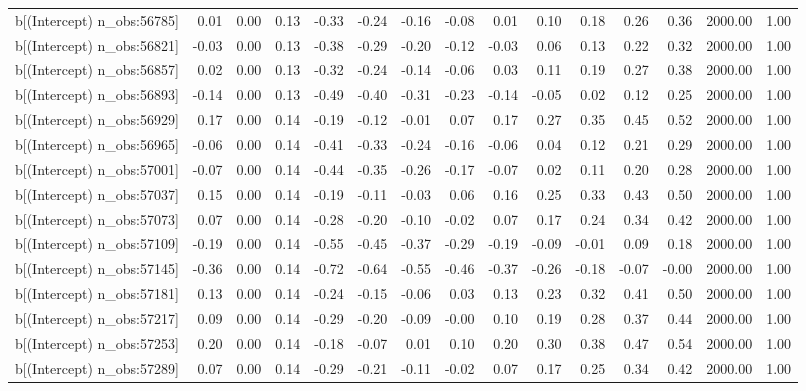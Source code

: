 \begin{table}[ht]
\begin{tabular}{rrrrrrrrrrrrrrr}
  b[(Intercept) n\_obs:56785] & 0.01 & 0.00 & 0.13 & -0.33 & -0.24 & -0.16 & -0.08 & 0.01 & 0.10 & 0.18 & 0.26 & 0.36 & 2000.00 & 1.00 \\ 
  b[(Intercept) n\_obs:56821] & -0.03 & 0.00 & 0.13 & -0.38 & -0.29 & -0.20 & -0.12 & -0.03 & 0.06 & 0.13 & 0.22 & 0.32 & 2000.00 & 1.00 \\ 
  b[(Intercept) n\_obs:56857] & 0.02 & 0.00 & 0.13 & -0.32 & -0.24 & -0.14 & -0.06 & 0.03 & 0.11 & 0.19 & 0.27 & 0.38 & 2000.00 & 1.00 \\ 
  b[(Intercept) n\_obs:56893] & -0.14 & 0.00 & 0.13 & -0.49 & -0.40 & -0.31 & -0.23 & -0.14 & -0.05 & 0.02 & 0.12 & 0.25 & 2000.00 & 1.00 \\ 
  b[(Intercept) n\_obs:56929] & 0.17 & 0.00 & 0.14 & -0.19 & -0.12 & -0.01 & 0.07 & 0.17 & 0.27 & 0.35 & 0.45 & 0.52 & 2000.00 & 1.00 \\ 
  b[(Intercept) n\_obs:56965] & -0.06 & 0.00 & 0.14 & -0.41 & -0.33 & -0.24 & -0.16 & -0.06 & 0.04 & 0.12 & 0.21 & 0.29 & 2000.00 & 1.00 \\ 
  b[(Intercept) n\_obs:57001] & -0.07 & 0.00 & 0.14 & -0.44 & -0.35 & -0.26 & -0.17 & -0.07 & 0.02 & 0.11 & 0.20 & 0.28 & 2000.00 & 1.00 \\ 
  b[(Intercept) n\_obs:57037] & 0.15 & 0.00 & 0.14 & -0.19 & -0.11 & -0.03 & 0.06 & 0.16 & 0.25 & 0.33 & 0.43 & 0.50 & 2000.00 & 1.00 \\ 
  b[(Intercept) n\_obs:57073] & 0.07 & 0.00 & 0.14 & -0.28 & -0.20 & -0.10 & -0.02 & 0.07 & 0.17 & 0.24 & 0.34 & 0.42 & 2000.00 & 1.00 \\ 
  b[(Intercept) n\_obs:57109] & -0.19 & 0.00 & 0.14 & -0.55 & -0.45 & -0.37 & -0.29 & -0.19 & -0.09 & -0.01 & 0.09 & 0.18 & 2000.00 & 1.00 \\ 
  b[(Intercept) n\_obs:57145] & -0.36 & 0.00 & 0.14 & -0.72 & -0.64 & -0.55 & -0.46 & -0.37 & -0.26 & -0.18 & -0.07 & -0.00 & 2000.00 & 1.00 \\ 
  b[(Intercept) n\_obs:57181] & 0.13 & 0.00 & 0.14 & -0.24 & -0.15 & -0.06 & 0.03 & 0.13 & 0.23 & 0.32 & 0.41 & 0.50 & 2000.00 & 1.00 \\ 
  b[(Intercept) n\_obs:57217] & 0.09 & 0.00 & 0.14 & -0.29 & -0.20 & -0.09 & -0.00 & 0.10 & 0.19 & 0.28 & 0.37 & 0.44 & 2000.00 & 1.00 \\ 
  b[(Intercept) n\_obs:57253] & 0.20 & 0.00 & 0.14 & -0.18 & -0.07 & 0.01 & 0.10 & 0.20 & 0.30 & 0.38 & 0.47 & 0.54 & 2000.00 & 1.00 \\ 
  b[(Intercept) n\_obs:57289] & 0.07 & 0.00 & 0.14 & -0.29 & -0.21 & -0.11 & -0.02 & 0.07 & 0.17 & 0.25 & 0.34 & 0.42 & 2000.00 & 1.00 \\ 

\end{tabular}
\end{table}
